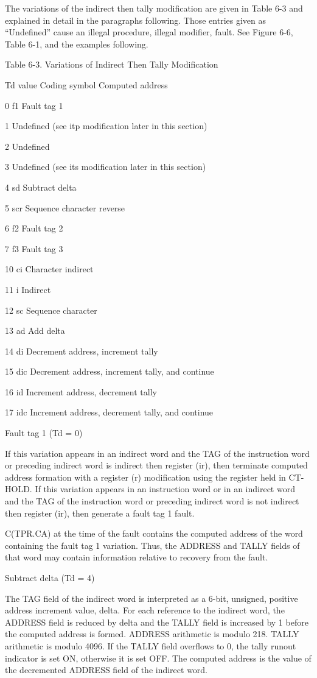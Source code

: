 The variations of the indirect then tally modification are given in Table 6-3
and explained in detail in the paragraphs following. Those entries given as
{``}Undefined'' cause an illegal procedure, illegal modifier, fault. See Figure
6-6, Table 6-1, and the examples following.

Table 6-3. Variations of Indirect Then Tally Modification

Td value Coding symbol Computed address

0 f1 Fault tag 1

1 Undefined (see itp modification later in this section)

2 Undefined 

3 Undefined (see its modification later in this section)

4 sd Subtract delta

5 scr Sequence character reverse

6 f2 Fault tag 2

7 f3 Fault tag 3 

10 ci Character indirect 

11 i Indirect 

12 sc Sequence character

13 ad Add delta

14 di Decrement address, increment tally

15 dic Decrement address, increment tally, and continue 

16 id Increment address, decrement tally

17 idc Increment address, decrement tally, and continue 

Fault tag 1 (Td = 0)


If this variation appears in an indirect word and the TAG of the instruction
word or preceding indirect word is indirect then register (ir), then terminate
computed address formation with a register (r) modification using the register
held in CT-HOLD. If this variation appears in an instruction word or in an
indirect word and the TAG of the instruction word or preceding indirect word is
not indirect then register (ir), then generate a fault tag 1 fault.


C(TPR.CA) at the time of the fault contains the computed address of the word
containing the fault tag 1 variation. Thus, the ADDRESS and TALLY fields of
that word may contain information relative to recovery from the fault.

Subtract delta (Td = 4)

The TAG field of the indirect word is interpreted as a 6-bit, unsigned,
positive address increment value, delta. For each reference to the indirect
word, the ADDRESS field is reduced by delta and the TALLY field is increased by
1 before the computed address is formed. ADDRESS arithmetic is modulo 218.
TALLY arithmetic is modulo 4096. If the TALLY field overflows to 0, the tally
runout indicator is set ON, otherwise it is set OFF. The computed address is
the value of the decremented ADDRESS field of the indirect word.  

